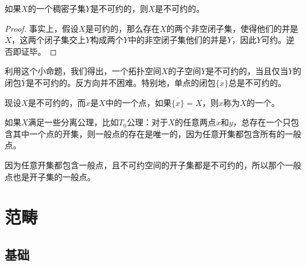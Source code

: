 \begin{pro}
如果$X$的一个稠密子集$Y$是不可约的，则$X$是不可约的。
\end{pro}

\begin{proof}
事实上，假设$X$是可约的，那么存在$X$的两个非空闭子集，使得他们的并是$X$，这两个闭子集交上$Y$构成两个$Y$中的非空闭子集他们的并是$Y$，因此$Y$可约。逆否即证毕。
\end{proof}

利用这个小命题，我们得出，一个拓扑空间$X$的子空间$Y$是不可约的，当且仅当$Y$的闭包$\bar{Y}$是不可约的。反方向并不困难。特别地，单点的闭包$\overline{\{x\}}$总是不可约的。

\para 现设$X$是不可约的，而$x$是$X$中的一个点，如果$\overline{\{x\}}=X$，则$x$称为$X$的一个。\endpara

如果$X$满足一些分离公理，比如$T_0$公理：对于$X$的任意两点$x$和$y$，总存在一个只包含其中一个点的开集，则一般点的存在是唯一的，因为任意开集都包含所有的一般点。

因为任意开集都包含一般点，且不可约空间的开子集都是不可约的，所以那个一般点也是开子集的一般点。

\chapter{范畴}
\renewcommand{\thepara}{\Alph{chapter}.\arabic{section}.\arabic{para}}
\section{基础}

